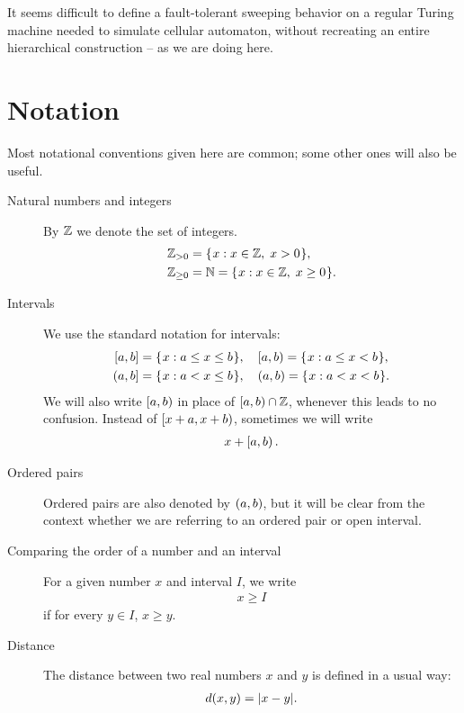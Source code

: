 \documentclass[12pt]{memoir}
\renewcommand{\le}{\leq}
\renewcommand{\ge}{\geq}
\begin{document}
It seems difficult to define a fault-tolerant sweeping 
behavior on a regular Turing machine needed to 
simulate cellular automaton, without recreating
an entire hierarchical construction -- as we are doing here.


\section{Notation}\label{sec:notation}

Most notational conventions given here are common; some other ones will
also be useful.

\begin{description}

\item [Natural numbers and integers] 
By \( \mathbb{Z} \) we denote the set of integers.
\begin{align*}
   \bbZ_{>0}&=\setOf{x}{x\in \bbZ,\;  x>0}, \\
   \bbZ_{\ge 0}&=\bbN=\setOf{x}{x\in \bbZ,\;  x\ge 0}.
\end{align*}

\item [Intervals]
We use the standard notation for intervals:
\begin{align*}
   \clint{a}{b}&=\setOf{x}{a\le x \le b},\quad \lint{a}{b}=\setOf{x}{a\le x < b}, \\
   \rint{a}{b}&=\setOf{x}{a< x \le b}, \quad  \opint{a}{b}=\setOf{x}{a< x < b}.
\end{align*}
We will also write \( \left[a,b\right) \) in place of \( \left[a,b\right)\cap \mathbb{Z} \), 
whenever this leads to no confusion.
Instead of \( \left[x+a,x+b\right) \), sometimes we will write 
\begin{align*}x + \left[a,b\right).\end{align*}

\item [Ordered pairs]
Ordered pairs are also denoted by \( (a,b) \),
but it will be clear from the context whether we are
referring to an ordered pair or open interval.

\item [Comparing the order of a number and an interval]
For a given number \( x \) and interval \( I \), we
write
\begin{align*} x \ge I \end{align*}
if for every \( y\in I \),  \( x \ge y \).

\item [Distance]
The distance between two real numbers \( x \) and \( y \) is defined
in a usual way:
\begin{align*}
    d(x,y)= \lvert x-y \rvert.
\end{align*}


\end{description}
\end{document}
